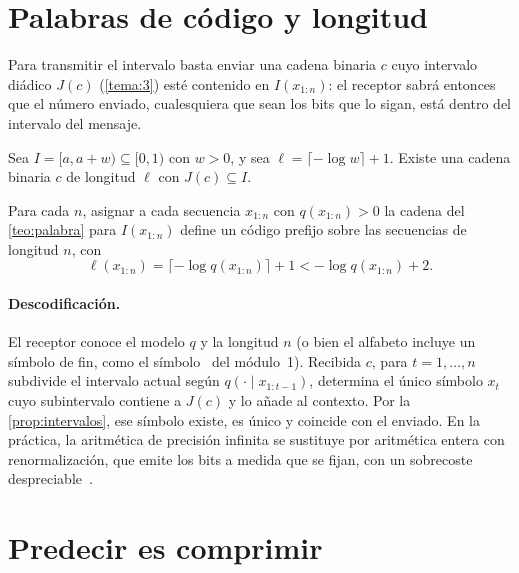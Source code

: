 \addtocounter{definicion}{1}%

\addtocounter{figure}{1}%

\section{Palabras de código y longitud}

Para transmitir el intervalo basta enviar una cadena binaria $c$ cuyo intervalo diádico $J(c)$ (\cref{tema:3}) esté contenido en $I(x_{1:n})$: el receptor sabrá entonces que el número enviado, cualesquiera que sean los bits que lo sigan, está dentro del intervalo del mensaje.

\begin{teorema}\label{teo:palabra}
Sea $I=[a,a+w)\subseteq[0,1)$ con $w>0$, y sea $\ell=\lceil-\log w\rceil+1$. Existe una cadena binaria $c$ de longitud $\ell$ con $J(c)\subseteq I$.
\end{teorema}

\begin{corolario}\label{cor:longitud}
Para cada $n$, asignar a cada secuencia $x_{1:n}$ con $q(x_{1:n})>0$ la cadena del \cref{teo:palabra} para $I(x_{1:n})$ define un código prefijo sobre las secuencias de longitud $n$, con
\[
\ell(x_{1:n})=\lceil-\log q(x_{1:n})\rceil+1<-\log q(x_{1:n})+2.
\]
\end{corolario}

\addtocounter{definicion}{1}%

\paragraph{Descodificación.} El receptor conoce el modelo $q$ y la longitud $n$ (o bien el alfabeto incluye un símbolo de fin, como el símbolo \fin\ del módulo~1). Recibida $c$, para $t=1,\dots,n$ subdivide el intervalo actual según $q(\cdot\mid x_{1:t-1})$, determina el único símbolo $x_t$ cuyo subintervalo contiene a $J(c)$ y lo añade al contexto. Por la \cref{prop:intervalos}, ese símbolo existe, es único y coincide con el enviado. En la práctica, la aritmética de precisión infinita se sustituye por aritmética entera con renormalización, que emite los bits a medida que se fijan, con un sobrecoste despreciable~\cite{wnc}.

\section{Predecir es comprimir}


